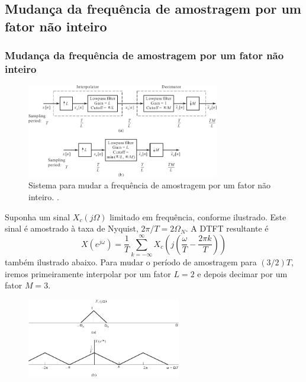 \subsection{Mudança da frequência de amostragem por um fator não inteiro}
\begin{frame}[allowframebreaks]
  \frametitle{Mudança da frequência de amostragem por um fator não inteiro}

        \begin{figure}[h!]
        \centering
        \includegraphics[width=0.75\textwidth]{images/fig429.pdf}
        \caption{Sistema para mudar a frequência de amostragem por um fator não inteiro. \citep{oppenheim2009}.}
        \label{fig:fig429}
        \end{figure}
  \framebreak

  \begin{example}
  Suponha um sinal $X_c(j\Omega)$ limitado em frequência, conforme ilustrado.
  Este sinal é amostrado à taxa de Nyquist, $2\pi/T = 2\Omega_N$. A DTFT resultante é
  \begin{equation}
  X(e^{j\omega}) = \frac{1}{T} \sum_{k=-\infty}^{\infty} X_c \left( j \left( \frac{\omega}{T} - \frac{2\pi k}{T} \right) \right)
  \end{equation}
  também ilustrado abaixo. Para mudar o período de amostragem para $(3/2)T$, iremos primeiramente interpolar por
  um fator $L=2$ e depois decimar por um fator $M=3$.

  \examplebreak

        \begin{figure}[h!]
        \centering
        \includegraphics[width=0.6\textwidth]{images/fig430ab.pdf}
        \label{fig:fig430ab}
        \end{figure}


\end{example}
\end{frame}
